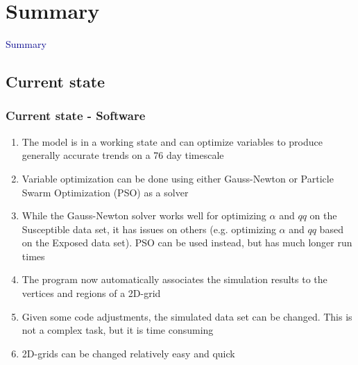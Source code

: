 \documentclass{beamer}
\begin{document}

\section{Summary}
\begin{frame}
	\centering
	\textcolor{darkblue}{\huge{Summary}}
\end{frame}
\subsection{Current state}
\begin{frame}
	\frametitle{Current state - Software}
	\begin{enumerate}[$\bullet$]
		\item The model is in a working state and can optimize variables to produce generally accurate trends on a 76 day timescale
		\item Variable optimization can be done using either Gauss-Newton or Particle Swarm Optimization (PSO) as a solver
		\item While the Gauss-Newton solver works well for optimizing $\alpha$ and $qq$ on the Susceptible data set, it has issues on others
			(e.g. optimizing $\alpha$ and $qq$ based on the Exposed data set). PSO can be used instead, but has much longer run times
		\item The program now automatically associates the simulation results to the vertices and regions of a 2D-grid
		\item Given some code adjustments, the simulated data set can be changed. This is not a complex task, but it is time consuming
		\item 2D-grids can be changed relatively easy and quick
	\end{enumerate}
\end{frame}
\end{document}

